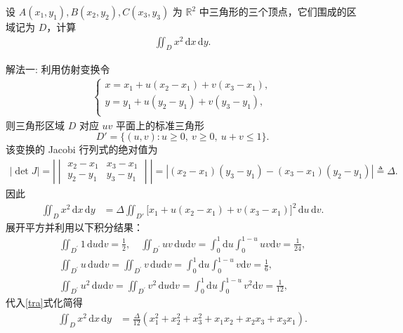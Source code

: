 \documentclass[../../main.tex]{subfiles}%
\begin{document}
\begin{example}
设 $A(x_1, y_1), B(x_2, y_2), C(x_3, y_3)$ 为 $\mathbb{R}^2$ 中三角形的三个顶点，它们围成的区域记为 $D$，计算
\begin{align*}
\iint_D x^2 \, \mathrm{d}x\,\mathrm{d}y.
\end{align*}
\end{example}
\begin{solution}

{\color{blue}解法一:} 利用仿射变换令
\begin{align*}
\begin{cases}
x=x_1+u(x_2-x_1)+v(x_3-x_1),\\
y=y_1+u(y_2-y_1)+v(y_3-y_1),\\
\end{cases}
\end{align*}
则三角形区域 $D$ 对应 $uv$ 平面上的标准三角形
\[
D' = \{(u,v): u\geqslant 0,\ v\geqslant 0,\ u+v\leqslant 1\}.
\]
该变换的 Jacobi 行列式的绝对值为
\begin{align*}
|\det J| = \left| \begin{vmatrix}
x_2-x_1 & x_3-x_1 \\
y_2-y_1 & y_3-y_1
\end{vmatrix} \right| 
= \left|(x_2-x_1)(y_3-y_1) - (x_3-x_1)(y_2-y_1)\right|\triangleq \Delta.
\end{align*}
因此
\begin{align}
\iint_D x^2 \, \mathrm{d}x\,\mathrm{d}y
&= \Delta \iint_{D'} \bigl[x_1+u(x_2-x_1)+v(x_3-x_1)\bigr]^2 \, \mathrm{d}u\,\mathrm{d}v. \label{tra}
\end{align}
展开平方并利用以下积分结果：
\begin{gather*}
\iint_{D^{\prime}}{1\,\mathrm{d}u\mathrm{d}v=\frac{1}{2},}\quad \iint_{D^{\prime}}{uv\,\mathrm{d}u\mathrm{d}v=\int_0^1{\mathrm{d}u\int_0^{1-u}{uv\mathrm{d}v}}=\frac{1}{24},}
\\
\iint_{D^{\prime}}{u\,\mathrm{d}u\mathrm{d}v=\iint_{D^{\prime}}{v\,\mathrm{d}u\mathrm{d}v}}=\int_0^1{\mathrm{d}u\int_0^{1-u}{v\mathrm{d}v}}=\frac{1}{6},
\\
\iint_{D^{\prime}}{u^2\,\mathrm{d}u\mathrm{d}v=\iint_{D^{\prime}}{v^2\,\mathrm{d}u\mathrm{d}v}}=\int_0^1{\mathrm{d}u\int_0^{1-u}{v^2\mathrm{d}v}}=\frac{1}{12},
\end{gather*}
代入\eqref{tra}式化简得
\begin{align*}
\iint_D x^2 \, \mathrm{d}x\,\mathrm{d}y
&= \frac{\Delta}{12}\left(x_1^2+x_2^2+x_3^2+x_1x_2+x_2x_3+x_3x_1\right).
\end{align*}


\end{solution}
\end{document}
